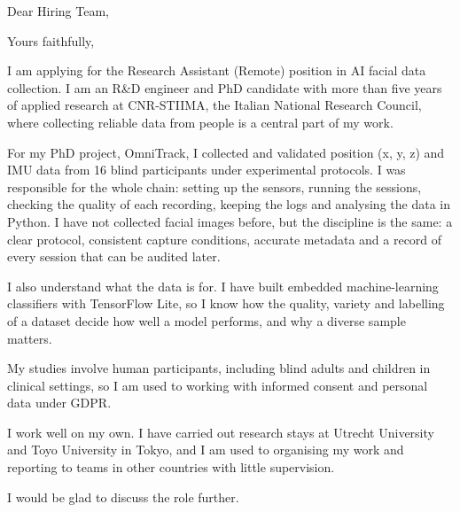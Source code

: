 \documentclass[11pt,a4paper,sans]{moderncv}
\begin{document}

\opening{Dear Hiring Team,}
\closing{Yours faithfully,}
\makelettertitle

I am applying for the Research Assistant (Remote) position in AI facial data collection. I am an R\&D engineer and PhD candidate with more than five years of applied research at CNR-STIIMA, the Italian National Research Council, where collecting reliable data from people is a central part of my work.

For my PhD project, OmniTrack, I collected and validated position (x, y, z) and IMU data from 16 blind participants under experimental protocols. I was responsible for the whole chain: setting up the sensors, running the sessions, checking the quality of each recording, keeping the logs and analysing the data in Python. I have not collected facial images before, but the discipline is the same: a clear protocol, consistent capture conditions, accurate metadata and a record of every session that can be audited later.

I also understand what the data is for. I have built embedded machine-learning classifiers with TensorFlow Lite, so I know how the quality, variety and labelling of a dataset decide how well a model performs, and why a diverse sample matters.

My studies involve human participants, including blind adults and children in clinical settings, so I am used to working with informed consent and personal data under GDPR.

I work well on my own. I have carried out research stays at Utrecht University and Toyo University in Tokyo, and I am used to organising my work and reporting to teams in other countries with little supervision.

I would be glad to discuss the role further.

\makeletterclosing
\end{document}
